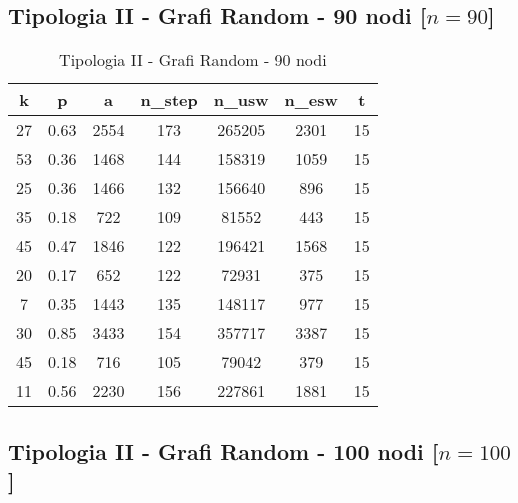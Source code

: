 \subsection{Tipologia II - Grafi Random - 90 nodi [$n=90$]}

\begin{table}[H]
\centering
\begin{tabular}{|c|c|c|c|c|c|c|}
\hline
\textbf{k} & \textbf{p} & \textbf{a} & \textbf{n\_step} & \textbf{n\_usw} & \textbf{n\_esw} & \textbf{t} \\ \hline
27 & 0.63 & 2554 & 173 & 265205 & 2301 & 15 \\ \hline
53 & 0.36 & 1468 & 144 & 158319 & 1059 & 15 \\ \hline
25 & 0.36 & 1466 & 132 & 156640 & 896 & 15 \\ \hline
35 & 0.18 & 722 & 109 & 81552 & 443 & 15 \\ \hline
45 & 0.47 & 1846 & 122 & 196421 & 1568 & 15 \\ \hline
20 & 0.17 & 652 & 122 & 72931 & 375 & 15 \\ \hline
7 & 0.35 & 1443 & 135 & 148117 & 977 & 15 \\ \hline
30 & 0.85 & 3433 & 154 & 357717 & 3387 & 15 \\ \hline
45 & 0.18 & 716 & 105 & 79042 & 379 & 15 \\ \hline
11 & 0.56 & 2230 & 156 & 227861 & 1881 & 15 \\ \hline
\end{tabular}
\caption{Tipologia II - Grafi Random - 90 nodi}
\label{tab:sperimentazione-tipo1-90nodi}
\end{table}

\subsection{Tipologia II - Grafi Random - 100 nodi [$n=100$]}

